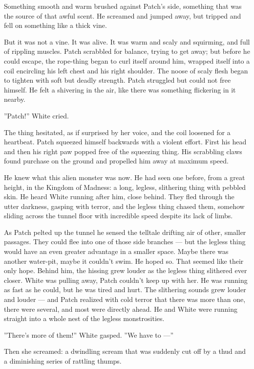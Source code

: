 \documentclass[12pt]{book}
\begin{document}
Something smooth and warm brushed against Patch's side, something that
was the source of that awful scent. He screamed and jumped away, but
tripped and fell on something like a thick vine.

But it was not a vine. It was alive. It was warm and scaly and
squirming, and full of rippling muscles. Patch scrabbled for balance,
trying to get away; but before he could escape, the rope-thing began
to curl itself around him, wrapped itself into a coil encircling his
left chest and his right shoulder. The noose of scaly flesh began to
tighten with soft but deadly strength. Patch struggled but could not
free himself. He felt a shivering in the air, like there was something
flickering in it nearby.

''Patch!'' White cried.

The thing hesitated, as if surprised by her voice, and the coil
loosened for a heartbeat. Patch squeezed himself backwards with a
violent effort. First his head and then his right paw popped free of
the squeezing thing. His scrabbling claws found purchase on the ground
and propelled him away at maximum speed.

He knew what this alien monster was now. He had seen one before, from
a great height, in the Kingdom of Madness: a long, legless, slithering
thing with pebbled skin. He heard White running after him, close
behind. They fled through the utter darkness, gasping with terror, and
the legless thing chased them, somehow sliding across the tunnel floor
with incredible speed despite its lack of limbs.

As Patch pelted up the tunnel he sensed the telltale drifting air of
other, smaller passages. They could flee into one of those side
branches --- but the legless thing would have an even greater
advantage in a smaller space. Maybe there was another water-pit, maybe
it couldn't swim. He hoped so. That seemed like their only
hope. Behind him, the hissing grew louder as the legless thing
slithered ever closer. White was pulling away, Patch couldn't keep up
with her. He was running as fast as he could, but he was tired and
hurt. The slithering sounds grew louder and louder --- and Patch
realized with cold terror that there was more than one, there were
several, and most were directly ahead. He and White were running
straight into a whole nest of the legless monstrosities.

''There's more of them!'' White gasped. ''We have to ---''

Then she screamed: a dwindling scream that was suddenly cut off by a
thud and a diminishing series of rattling thumps.
\end{document}
